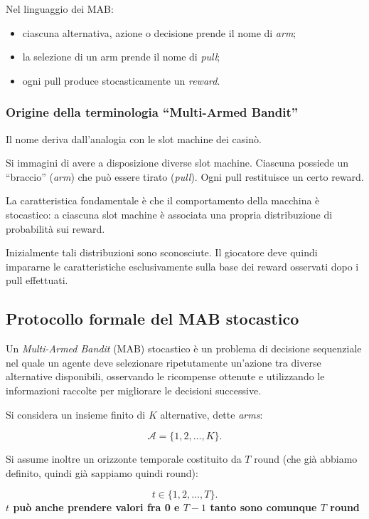 Nel linguaggio dei MAB:
\begin{itemize}
    \item ciascuna alternativa, azione o decisione prende il nome di \emph{arm};
    \item la selezione di un arm prende il nome di \emph{pull};
    \item ogni pull produce stocasticamente un \emph{reward}.
\end{itemize}

\subsubsection{Origine della terminologia ``Multi-Armed Bandit''}

Il nome deriva dall'analogia con le slot machine dei casinò.

Si immagini di avere a disposizione diverse slot machine. Ciascuna possiede un ``braccio'' (\emph{arm}) che può essere tirato (\emph{pull}). Ogni pull restituisce un certo reward.

La caratteristica fondamentale è che il comportamento della macchina è stocastico: a ciascuna slot machine è associata una propria distribuzione di probabilità sui reward.

Inizialmente tali distribuzioni sono sconosciute. Il giocatore deve quindi impararne le caratteristiche esclusivamente sulla base dei reward osservati dopo i pull effettuati.


\subsection{Protocollo formale del MAB stocastico}

Un \textit{Multi-Armed Bandit} (MAB) stocastico è un problema di decisione sequenziale nel quale un agente deve selezionare ripetutamente un'azione tra diverse alternative disponibili, osservando le ricompense ottenute e utilizzando le informazioni raccolte per migliorare le decisioni successive.

Si considera un insieme finito di $K$ alternative, dette \textit{arms}:

\[
\mathcal{A} = \{1,2,\ldots,K\}.
\]

Si assume inoltre un orizzonte temporale costituito da $T$ round (che già abbiamo definito, quindi già sappiamo quindi round):

\[
t \in \{1,2,\ldots,T\}.
\]
\textbf{$t$ può anche prendere valori fra 0 e $T-1$ tanto sono comunque $T$ round}

